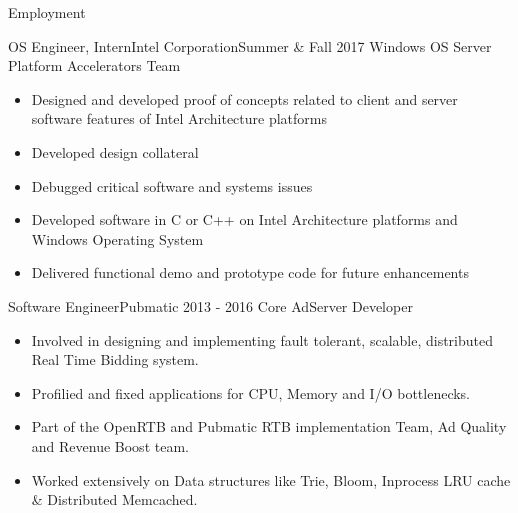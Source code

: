 \documentclass[]{mcdowellcv}
\begin{document}
	\makeheader
	
	\begin{cvsection}{Employment}
		\begin{cvsubsection}{OS Engineer, Intern}{Intel Corporation}{Summer \& Fall 2017}
			Windows OS Server Platform Accelerators Team			
			\begin{itemize}
			\item Designed and developed proof of concepts related to client and server software features of Intel Architecture platforms 
			\item Developed design collateral 
			\item Debugged critical software and systems issues 
			\item Developed software in C or C++ on Intel Architecture platforms and Windows Operating System 
			\item Delivered functional demo and prototype code for future enhancements 			
		\end{itemize}
		\end{cvsubsection}
		
		\begin{cvsubsection}{Software Engineer}{Pubmatic }{2013 - 2016}	
			Core AdServer Developer
			\begin{itemize}
			\item Involved in designing and implementing fault tolerant, scalable, distributed Real Time Bidding system.
			\item  Profilied and fixed applications for CPU, Memory and I/O bottlenecks.
			\item Part of the OpenRTB and Pubmatic RTB implementation Team, Ad Quality and Revenue Boost team.
			\item Worked extensively on Data structures like Trie, Bloom, Inprocess LRU cache \& Distributed Memcached.
			\end{itemize}
		\end{cvsubsection}
		
		\end{cvsection}
	
\end{document}
